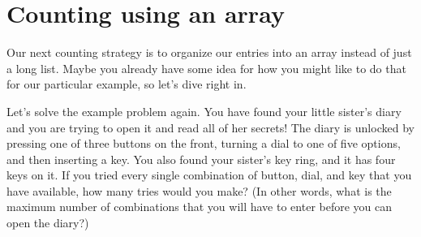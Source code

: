 \documentclass{ximera}
\begin{document}
\section{Counting using an array}
Our next counting strategy is to organize our entries into an array instead of just a long list. Maybe you already have some idea for how you might like to do that for our particular example, so let's dive right in.
\begin{example}
Let's solve the example problem again. You have found your little sister's diary and you are trying to open it and read all of her secrets! The diary is unlocked by pressing one of three buttons on the front, turning a dial to one of five options, and then inserting a key. You also found your sister's key ring, and it has four keys on it. If you tried every single combination of button, dial, and key that you have available, how many tries would you make? (In other words, what is the maximum number of combinations that you will have to enter before you can open the diary?)


\end{example}
\end{document}
